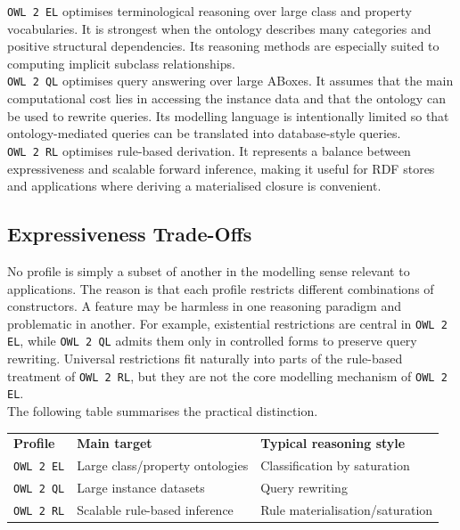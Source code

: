 \documentclass{scrbook}
\begin{document}
	\texttt{OWL 2 EL} optimises terminological reasoning over large class and property vocabularies. It is strongest when the ontology describes many categories and positive structural dependencies. Its reasoning methods are especially suited to computing implicit subclass relationships.\\
	
	\texttt{OWL 2 QL} optimises query answering over large ABoxes. It assumes that the main computational cost lies in accessing the instance data and that the ontology can be used to rewrite queries. Its modelling language is intentionally limited so that ontology-mediated queries can be translated into database-style queries.\\
	
	\texttt{OWL 2 RL} optimises rule-based derivation. It represents a balance between expressiveness and scalable forward inference, making it useful for RDF stores and applications where deriving a materialised closure is convenient.
	
	\subsection{Expressiveness Trade-Offs}
	
	No profile is simply a subset of another in the modelling sense relevant to applications. The reason is that each profile restricts different combinations of constructors. A feature may be harmless in one reasoning paradigm and problematic in another. For example, existential restrictions are central in \texttt{OWL 2 EL}, while \texttt{OWL 2 QL} admits them only in controlled forms to preserve query rewriting. Universal restrictions fit naturally into parts of the rule-based treatment of \texttt{OWL 2 RL}, but they are not the core modelling mechanism of \texttt{OWL 2 EL}.\\
	
	The following table summarises the practical distinction.
	
	\begin{center}
		\begin{tabular}{lll}
			\textbf{Profile} & \textbf{Main target} & \textbf{Typical reasoning style} \\
			\texttt{OWL 2 EL} & Large class/property ontologies & Classification by saturation \\
			\texttt{OWL 2 QL} & Large instance datasets & Query rewriting \\
			\texttt{OWL 2 RL} & Scalable rule-based inference & Rule materialisation/saturation \\
		\end{tabular}
	\end{center}
	
\end{document}
